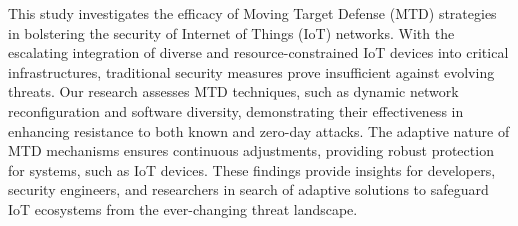 This study investigates the efficacy of Moving Target Defense (MTD) strategies in bolstering the security of Internet of Things (IoT) networks. With the escalating integration of diverse and resource-constrained IoT devices into critical infrastructures, traditional security measures prove insufficient against evolving threats. Our research assesses MTD techniques, such as dynamic network reconfiguration and software diversity, demonstrating their effectiveness in enhancing resistance to both known and zero-day attacks. The adaptive nature of MTD mechanisms ensures continuous adjustments, providing robust protection for systems, such as IoT devices. These findings provide insights for developers, security engineers, and researchers in search of adaptive solutions to safeguard IoT ecosystems from the ever-changing threat landscape.